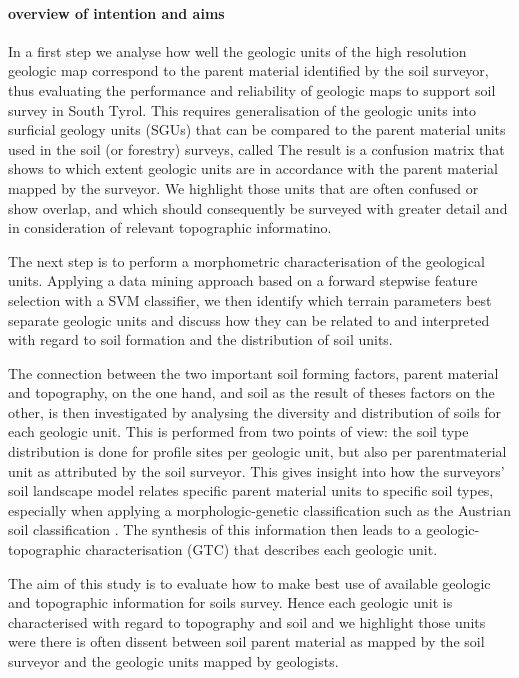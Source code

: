 \documentclass[preprint,12pt,authoryear]{elsarticle}
\begin{document}
\paragraph{overview of intention and aims}
In a first step we analyse how well the geologic units of the high resolution geologic map correspond to the parent material identified by the soil surveyor, thus evaluating the performance and reliability of geologic maps to support soil survey in South Tyrol. This requires generalisation of the geologic units into surficial geology units (SGUs) that can be compared to the parent material units used in the soil (or forestry) surveys, called  The result is a confusion matrix that shows to which extent geologic units are in accordance with the parent material mapped by the surveyor.  We highlight those units that are often confused or show overlap, and which should consequently be surveyed with greater detail and in consideration of relevant topographic informatino.

The next step is to perform a morphometric characterisation of the geological units. Applying a data mining approach based on a forward stepwise feature selection with a SVM classifier, we then identify which terrain parameters best separate geologic units and discuss how they can be related to and interpreted with regard to soil formation and the distribution of soil units.

The connection between the two important soil forming factors, parent material and topography, on the one hand, and soil as the result of theses factors on the other, is then investigated by analysing the diversity and distribution of soils for each geologic unit. This is performed from two points of view: the soil type distribution is done for profile sites per geologic unit, but also per parentmaterial unit as attributed by the soil surveyor. This gives insight into how the surveyors' soil landscape model relates specific parent material units to specific soil types, especially when applying a morphologic-genetic classification such as the Austrian soil classification \citep{Nestroy2011}. The synthesis of this information then leads to a geologic-topographic characterisation (GTC) that describes each geologic unit. 

The aim of this study is to evaluate how to make best use of available geologic and topographic information for soils survey. Hence each geologic unit is characterised with regard to topography and soil and we highlight those units were there is often dissent between soil parent material as mapped by the soil surveyor and the geologic units mapped by geologists.
\end{document}
